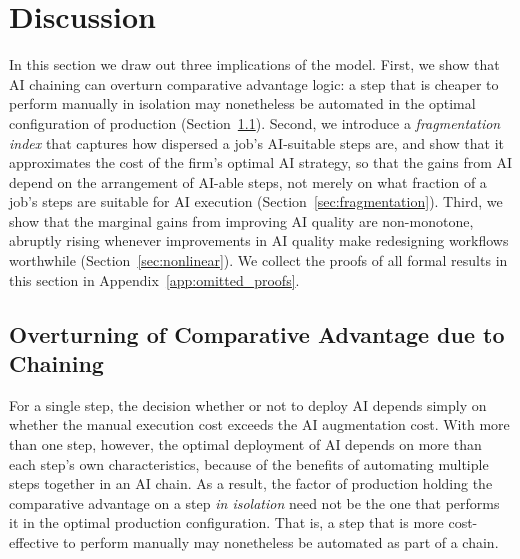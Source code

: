 \section{Discussion}

In this section we draw out three implications of the model.
First, we show that AI chaining can overturn comparative advantage logic: a step that is cheaper to perform manually in isolation may nonetheless be automated in the optimal configuration of production (Section~\ref{sec:comparative_advantage}).
Second, we introduce a \emph{fragmentation index} that captures how dispersed a job's AI-suitable steps are, and show that it approximates the cost of the firm's optimal AI strategy, so that the gains from AI depend on the arrangement of AI-able steps, not merely on what fraction of a job's steps are suitable for AI execution (Section~\ref{sec:fragmentation}).
Third, we show that the marginal gains from improving AI quality are non-monotone, abruptly rising whenever improvements in AI quality make redesigning workflows worthwhile (Section~\ref{sec:nonlinear}).
We collect the proofs of all formal results in this section in Appendix~\ref{app:omitted_proofs}.

\subsection{Overturning of Comparative Advantage due to Chaining}
\label{sec:comparative_advantage}

For a single step, the decision whether or not to deploy AI depends simply on whether the manual execution cost exceeds the AI augmentation cost.
With more than one step, however, the optimal deployment of AI depends on more than each step's own characteristics, because of the benefits of automating multiple steps together in an AI chain.
As a result, the factor of production holding the comparative advantage on a step \emph{in isolation} need not be the one that performs it in the optimal production configuration.
That is, a step that is more cost-effective to perform manually may nonetheless be automated as part of a chain.

